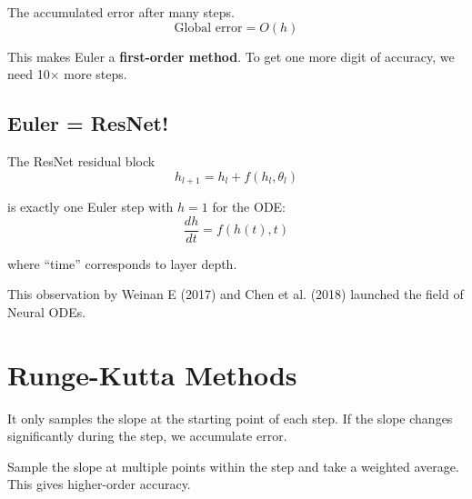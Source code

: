 
 The accumulated error after many steps.
\begin{equation}
    \text{Global error} = O(h)
\end{equation}

This makes Euler a \textbf{first-order method}. To get one more digit of accuracy, we need 10$\times$ more steps.


\subsection{Euler = ResNet!}

 The ResNet residual block
\begin{equation}
    h_{l+1} = h_l + f(h_l, \theta_l)
\end{equation}

is exactly one Euler step with $h = 1$ for the ODE:
\begin{equation}
    \frac{dh}{dt} = f(h(t), t)
\end{equation}

where ``time'' corresponds to layer depth.


This observation by Weinan E (2017) and Chen et al. (2018) launched the field of Neural ODEs.




\newpage
\section{Runge-Kutta Methods}

 It only samples the slope at the starting point of each step. If the slope changes significantly during the step, we accumulate error.

 Sample the slope at multiple points within the step and take a weighted average. This gives higher-order accuracy.


